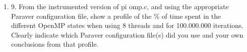 \documentclass[12pt]{article}
\begin{document}
\begin{enumerate}
\item[] 9. From the instrumented version of pi omp.c, and using the appropriate Paraver configuration file,
show a profile of the \% of time spent in the different OpenMP states when using 8 threads and for
100.000.000 iterations. Clearly indicate which Paraver configuration file(s) did you use and your
own conclusions from that profile.




\end{enumerate}
\end{document}
